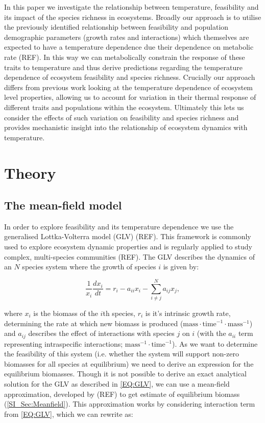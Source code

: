 \documentclass{article}
\begin{document}
In this paper we investigate the relationship between temperature, feasibility and its impact of the species richness in ecosystems. Broadly our approach is to utilise the previously identified relationship between feasibility and population demographic parameters (growth rates and interactions) which themselves are expected to have a temperature dependence due their dependence on metabolic rate (REF). In this way we can metabolically constrain the response of these traits to temperature and thus derive predictions regarding the temperature dependence of ecosystem feasibility and species richness. Crucially our approach differs from previous work looking at the temperature dependence of ecosystem level properties, allowing us to account for variation in their thermal response of different traits and populations within the ecosystem. Ultimately this lets us consider the effects of such variation on feasibility and species richness and provides mechanistic insight into the relationship of ecosystem dynamics with temperature.

\section{Theory}
\subsection{The mean-field model}
In order to explore feasibility and its temperature dependence we use the generalised Lottka-Volterra model (GLV) (REF). This framework is commonly used to explore ecosystem dynamic properties and is regularly applied to study complex, multi-species communities (REF). The GLV describes the dynamics of an $N$ species system where the growth of species $i$ is given by:

\begin{equation} \label{EQ:GLV}
  \frac{1}{x_i} \frac{dx_i}{dt} = r_i - a_{ii} x_i - \sum^N_{i \neq j} a_{ij} x_j, 
\end{equation}

where $x_i$ is the biomass of the $i$th species, $r_i$ is it's intrinsic growth rate, determining the rate at which new biomass is produced ($\text{mass} \cdot \text{time}^{-1} \cdot \text{mass}^{-1} $) and $a_{ij}$ describes the effect of interactions with species $j$ on $i$ (with the $a_{ii}$ term representing intraspecific interactions; $\text{mass}^{-1} \cdot \text{time}^{-1}$). As we want to determine the feasibility of this system (i.e. whether the system will support non-zero biomasses for all species at equilibrium) we need to derive an expression for the equilibrium biomasses. Though it is not possible to derive an exact analytical solution for the GLV as described in \cref{EQ:GLV}, we can use a mean-field approximation, developed by (REF) to get estimate of equilibrium biomass (\cref{SI_Sec:Meanfield}). This approximation works by considering interaction term from \cref{EQ:GLV}, which we can rewrite as:
\end{document}
